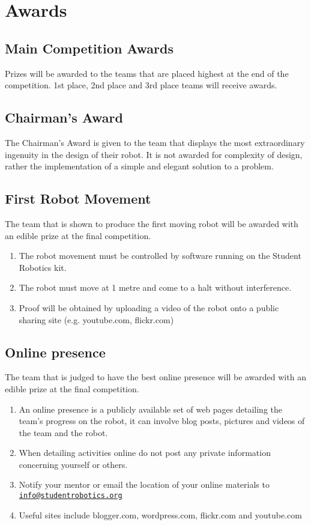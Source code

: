 \section {Awards}
\label{sec:Awards}

\subsection{Main Competition Awards}
Prizes will be awarded to the teams that are placed highest at the end of the competition. 1st place, 2nd place and 3rd place teams will receive awards.

\subsection{Chairman's Award}
The Chairman's Award is given to the team that displays the most extraordinary ingenuity in the design of their robot. It is not awarded for complexity of design, rather the implementation of a simple and elegant solution to a problem.

\subsection{First Robot Movement}
The team that is shown to produce the first moving robot will be awarded with an edible prize at the final competition.
\begin{enumerate}
\item The robot movement must be controlled by software running on the Student Robotics kit.
\item The robot must move at 1 metre and come to a halt without interference.
\item Proof will be obtained by uploading a video of the robot onto a public sharing site (e.g. youtube.com, flickr.com)
\end{enumerate}


\subsection{Online presence} 
The team that is judged to have the best online presence will be awarded with an edible prize at the final competition.
\begin{enumerate}
\item An online presence is a publicly available set of web pages detailing the team's progress on the robot, it can involve blog posts, pictures and videos of the team and the robot.
\item When detailing activities online do not post any private information concerning yourself or others.
\item Notify your mentor or email the location of your online materials to \href{mailto:info@studentrobotics.org}{\nolinkurl{info@studentrobotics.org}}
\item Useful sites include blogger.com, wordpress.com, flickr.com and youtube.com
\end{enumerate}
